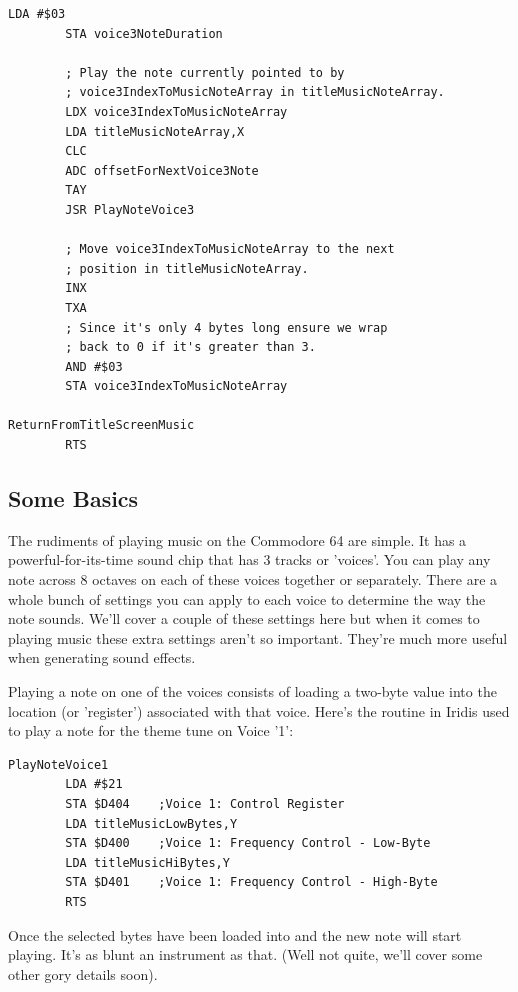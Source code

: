 \begin{lstlisting}[caption=Routine responsible for playing the title tune.]
        LDA #$03
        STA voice3NoteDuration

        ; Play the note currently pointed to by 
        ; voice3IndexToMusicNoteArray in titleMusicNoteArray.
        LDX voice3IndexToMusicNoteArray
        LDA titleMusicNoteArray,X
        CLC
        ADC offsetForNextVoice3Note
        TAY
        JSR PlayNoteVoice3

        ; Move voice3IndexToMusicNoteArray to the next
        ; position in titleMusicNoteArray.
        INX
        TXA
        ; Since it's only 4 bytes long ensure we wrap
        ; back to 0 if it's greater than 3.
        AND #$03
        STA voice3IndexToMusicNoteArray

ReturnFromTitleScreenMusic   
        RTS
\end{lstlisting}

\subsection{Some Basics}
The rudiments of playing music on the Commodore 64 are simple. It has a powerful-for-its-time
sound chip that has 3 tracks or 'voices'. You can play any note across 8 octaves on each of
these voices together or separately. There are a whole bunch of settings you can apply
to each voice to determine the way the note sounds. We'll cover a couple of these settings
here but when it comes to playing music these extra settings aren't so important. They're
much more useful when generating sound effects.

Playing a note on one of the voices consists of loading a two-byte value into the location
(or 'register') associated with that voice. Here's the routine in Iridis used to play a note
for the theme tune on Voice '1':

\begin{lstlisting}[caption=Plays a note on Voice 1. The routine is supplied with a value in Y
that indexes into two arrays\ containing the first (Hi) and second (Lo) byte respectively\ associated with the selected note.]
PlayNoteVoice1
        LDA #$21
        STA $D404    ;Voice 1: Control Register
        LDA titleMusicLowBytes,Y
        STA $D400    ;Voice 1: Frequency Control - Low-Byte
        LDA titleMusicHiBytes,Y
        STA $D401    ;Voice 1: Frequency Control - High-Byte
        RTS
\end{lstlisting}

Once the selected bytes have been loaded into  and  the new note will start playing. 
It's as blunt an instrument as that. (Well not quite, we'll cover some other gory details soon). 

